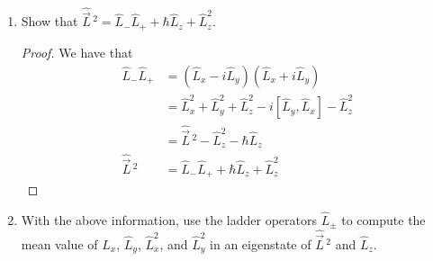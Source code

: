 \documentclass[../psets.tex]{subfiles}
\begin{document}
\begin{enumerate}
\begin{enumerate}
\begin{equation}
        \end{equation}
        \begin{proof}
            Let $Y_{\ell m}$ be an eigenstate of $\hat{\vec{L}}{\,}^2,\hat{L}_z$. Then we have the following by hypothesis.
            \begin{align*}
                \hat{\vec{L}}{\,}^2Y_{\ell m} &= \hbar^2\ell(\ell+1)Y_{\ell m}&
                \hat{L}_zY_{\ell m} &= \hbar mY_{\ell m}
            \end{align*}
            When we apply $\hat{L}_z$ to $\hat{L}_+Y_{\ell m}$, we get
            \begin{align*}
                \hat{L}_z(\hat{L}_+Y_{\ell m}) &= \left[ \hat{L}_+\hat{L}_z-(\hat{L}_+\hat{L}_z-\hat{L}_z\hat{L}_+) \right]Y_{\ell m}\\
                &= \hat{L}_+\hbar mY_{\ell m}+\hbar\hat{L}_+Y_{\ell m}\\
                &= \hbar(m+1)(\hat{L}_+Y_{\ell m})
            \end{align*}
            Thus,
            \begin{equation*}
                \hat{L}_+Y_{\ell m} \propto Y_{\ell(m+1)}
            \end{equation*}
            We can prove in a similar fashion that
            \begin{equation*}
                \hat{L}_-Y_{\ell m} \propto Y_{\ell(m-1)}
            \end{equation*}
        \end{proof}
        \item Show that $\hat{\vec{L}}{\,}^2=\hat{L}_-\hat{L}_++\hbar\hat{L}_z+\hat{L}_z^2$.
        \begin{proof}
            We have that
            \begin{align*}
                \hat{L}_-\hat{L}_+ &= (\hat{L}_x-i\hat{L}_y)(\hat{L}_x+i\hat{L}_y)\\
                &= \hat{L}_x^2+\hat{L}_y^2+\hat{L}_z^2-i[\hat{L}_y,\hat{L}_x]-\hat{L}_z^2\\
                &= \hat{\vec{L}}{\,}^2-\hat{L}_z^2-\hbar\hat{L}_z\\
                \hat{\vec{L}}{\,}^2 &= \hat{L}_-\hat{L}_++\hbar\hat{L}_z+\hat{L}_z^2
            \end{align*}
        \end{proof}
        \item With the above information, use the ladder operators $\hat{L}_\pm$ to compute the mean value of $\hat{L}_x$, $\hat{L}_y$, $\hat{L}_x^2$, and $\hat{L}_y^2$ in an eigenstate of $\hat{\vec{L}}{\,}^2$ and $\hat{L}_z$.

\end{enumerate}
\end{enumerate}
\end{document}
